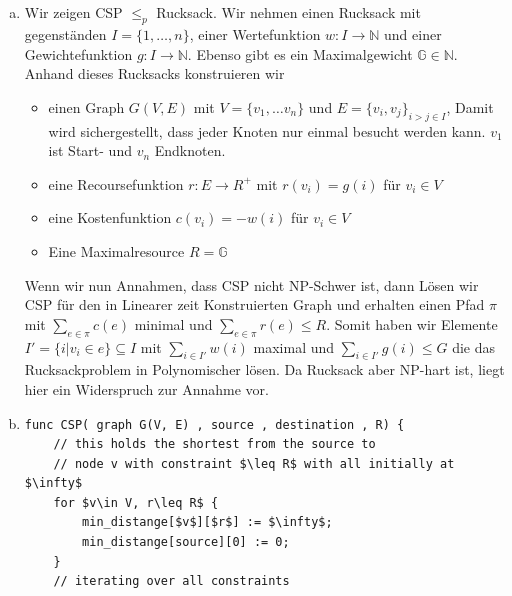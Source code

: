 \documentclass{article}
\newcommand{\N}{\mathbb{N}}
\begin{document}
    \section{}
    \begin{enumerate}[a)]
        \item
            Wir zeigen CSP $\leq_p$ Rucksack.
            Wir nehmen einen Rucksack mit gegenständen $I=\{1,\hdots,n\}$,
            einer Wertefunktion $w:I\rightarrow \N$ und einer
            Gewichtefunktion $g:I\rightarrow \N$.
            Ebenso gibt es ein Maximalgewicht $\mathbb G\in\N$.
            Anhand dieses Rucksacks konstruieren wir

            \begin{itemize}
                \item einen Graph $G(V, E)$
                    mit $V=\{v_1,\hdots v_n\}$
                    und $E=\{v_i,v_j\}_{i>j\in I}$,
                    Damit wird sichergestellt, dass jeder Knoten nur
                    einmal besucht werden kann.
                    $v_1$ ist Start- und $v_n$ Endknoten.
                \item eine Recoursefunktion $r:E\rightarrow R^+$
                    mit $r(v_i)=g(i)$ für $v_i\in V$
                \item eine Kostenfunktion
                    $c(v_i)=-w(i)$ für $v_i\in V$
                \item Eine Maximalresource $R=\mathbb G$
            \end{itemize}
            Wenn wir nun Annahmen, dass CSP nicht NP-Schwer ist, dann Lösen wir
            CSP für den in Linearer zeit Konstruierten Graph und erhalten
            einen Pfad $\pi$ mit
            $\sum_{e\in\pi} c(e)$ minimal und $\sum_{e\in\pi}r(e)\leq R$.
            Somit haben wir Elemente $I'=\{i|v_i\in e\}\subseteq I$
            mit
            $\sum_{i\in I'} w(i)$ maximal und $\sum_{i\in I'}g(i)\leq G$
            die das Rucksackproblem in Polynomischer lösen. Da Rucksack
            aber NP-hart ist, liegt hier ein Widerspruch zur Annahme vor.
        \newpage
        \item
        \begin{lstlisting}[mathescape=true]
func CSP( graph G(V, E) , source , destination , R) {
    // this holds the shortest from the source to
    // node v with constraint $\leq R$ with all initially at $\infty$
    for $v\in V, r\leq R$ {
        min_distange[$v$][$r$] := $\infty$;
        min_distange[source][0] := 0;
    }
    // iterating over all constraints

\end{lstlisting}
\end{enumerate}
\end{document}
